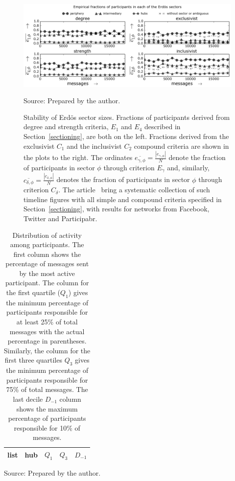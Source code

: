 \begin{figure} 
\centering
\caption{Stability of Erd\"os sector sizes.
Fractions of participants derived from degree and strength criteria, $E_1$ and $E_4$ described in Section~\ref{sectioning}, are both on the left.
Fractions derived from the exclusivist $C_1$ and the inclusivist $C_2$ compound criteria are shown in the plots to the right.
The ordinates $\overline{e_{\gamma,\phi}}=\frac{|e_{\gamma,\phi}|}{N}$ denote the fraction of participants in sector $\phi$ through criterion $E_\gamma$
and, similarly, $\overline{c_{\delta,\phi}}=\frac{|c_{\delta,\phi}|}{N}$ denotes the fraction of participants in sector $\phi$ through criterion $C_\delta$.
The article~\cite{stab} bring a systematic collection of such timeline figures with all simple and compound criteria specified in Section~\ref{sectioning}, with results for networks from Facebook, Twitter and Participabr.}
\includegraphics[width=\textwidth]{figs/InText-WLAU-S1000__}
\begin{flushleft}
Source: Prepared by the author.\
\end{flushleft}
\label{fig:sectIL}
\end{figure}


\begin{table}[h]
\caption{Distribution of activity among participants.
The first column shows the percentage of messages sent by the most active participant. The column for the first quartile ($Q_1$) gives the minimum percentage of participants responsible for at least 25\% of total messages with the actual percentage in parentheses. Similarly, the column for the first three quartiles $Q_3$ gives the minimum percentage of participants responsible for 75\% of total messages.
The last decile $D_{-1}$ column shows the maximum percentage of participants responsible for 10\% of messages.}
\begin{center}
\begin{tabular}{ | l ||  c | c | c | c | }
\hline
list & hub & $ Q_1 $ & $ Q_3 $ & $D_{-1}$ \\ \hline

\end{tabular}
\end{center}
\begin{flushleft}
Source: Prepared by the author.\
\end{flushleft}
\label{autores}
\end{table}


